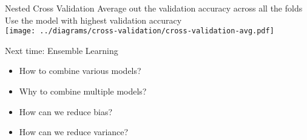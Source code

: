\documentclass[usenames,dvipsnames]{beamer}
\begin{document}
\begin{frame}{Nested Cross Validation}
Average out the validation accuracy across all the folds\\
Use the model with highest validation accuracy\\
\texttt{[image: ../diagrams/cross-validation/cross-validation-avg.pdf]}
\end{frame}

\begin{frame}{Next time: Ensemble Learning}
\begin{itemize}
\item How to combine various models?
\item Why to combine multiple models?
\item How can we reduce bias?
\item How can we reduce variance?
\end{itemize}
\end{frame}
\end{document}
